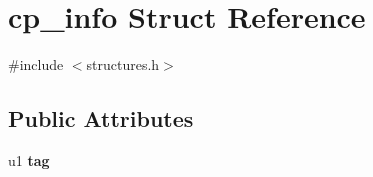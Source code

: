\hypertarget{structcp__info}{}\section{cp\+\_\+info Struct Reference}
\label{structcp__info}


{\ttfamily \#include $<$structures.\+h$>$}

\subsection*{Public Attributes}
\begin{DoxyCompactItemize}
\item 
u1 {\bfseries tag}\hypertarget{structcp__info_a045b8801a6e96a2a31d3b62ea684f141}{}\label{structcp__info_a045b8801a6e96a2a31d3b62ea684f141}


\end{DoxyCompactItemize}

